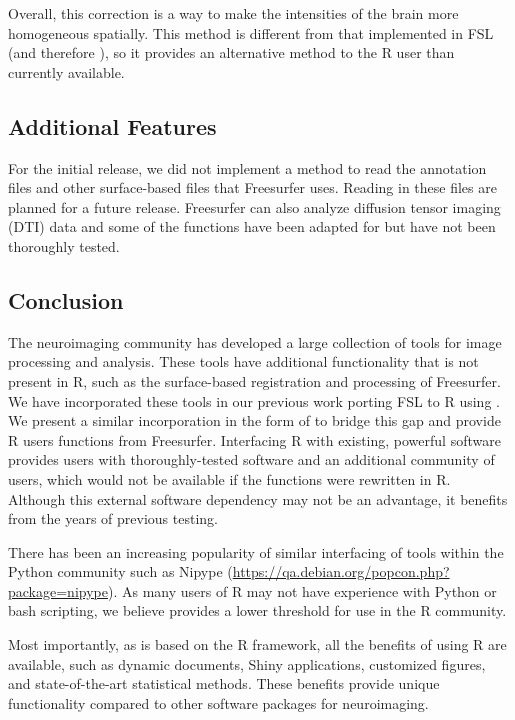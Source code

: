 Overall, this correction is a way to make the intensities of the brain
more homogeneous spatially. This method is different from that
implemented in FSL (and therefore ), so it provides an
alternative method to the R user than currently available.

\subsection{Additional Features}\label{additional-features}

For the initial release, we did not implement a method to read the
annotation files and other surface-based files that Freesurfer uses.
Reading in these files are planned for a future release. Freesurfer can
also analyze diffusion tensor imaging (DTI) data and some of the
functions have been adapted for  but have not been
thoroughly tested.

\subsection{Conclusion}\label{conclusion}

The neuroimaging community has developed a large collection of tools for
image processing and analysis. These tools have additional functionality
that is not present in R, such as the surface-based registration and
processing of Freesurfer. We have incorporated these tools in our
previous work porting FSL to R using . We present a similar
incorporation in the form of  to bridge this gap and
provide R users functions from Freesurfer. Interfacing R with existing,
powerful software provides users with thoroughly-tested software and an
additional community of users, which would not be available if the
functions were rewritten in R. Although this external software
dependency may not be an advantage, it benefits from the years of
previous testing.

There has been an increasing popularity of similar interfacing of tools
within the Python community such as Nipype
\citep{gorgolewski_nipype:_2011}
(\url{https://qa.debian.org/popcon.php?package=nipype}). As many users
of R may not have experience with Python or bash scripting, we believe
 provides a lower threshold for use in the R community.

Most importantly, as  is based on the R framework, all
the benefits of using R are available, such as dynamic documents, Shiny
applications, customized figures, and state-of-the-art statistical
methods. These benefits provide unique functionality compared to other
software packages for neuroimaging.

